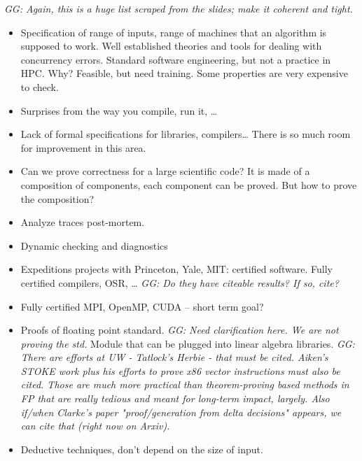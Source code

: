  
 
 \begin{tiny}
 {\small\em GG: Again, this is a huge list scraped
 from the slides; make it coherent and tight.}
 
\begin{itemize}
\item Specification of range of inputs, range of machines that an algorithm is supposed to work. Well established theories and tools for dealing with concurrency errors. Standard software engineering, but not a practice in HPC. Why? Feasible, but need training. Some properties are very expensive to check. 

\item Surprises from the way you compile, run it, …

\item Lack of formal specifications for libraries, compilers… There is so much room for improvement in this area.

\item Can we prove correctness for a large scientific code? It is made of a composition of components, each component can be proved. But how to prove the composition?

\item  Analyze traces post-mortem. 

\item  Dynamic  checking and diagnostics

\item  Expeditions projects with Princeton, Yale, MIT: certified software. Fully certified compilers, OSR, …
 {\small\em GG: Do they have citeable results? If so, cite?}
 
\item  Fully certified MPI, OpenMP, CUDA – short term goal?

\item  Proofs of floating point standard. {\small\em GG: Need clarification here. We are not proving the std.}  Module that can be plugged into linear algebra libraries.
 {\small\em GG: There are efforts at UW - Tatlock's Herbie - that must be cited. Aiken's STOKE work plus his 
 efforts to prove x86 vector instructions must also
 be cited. Those are much more practical than theorem-proving based methods in FP that are really tedious and meant for long-term impact, largely. Also if/when Clarke's paper "proof/generation from delta decisions" appears, 
 we can cite that (right now on Arxiv).}

\item  Deductive techniques, don’t depend on the size of input.


\end{itemize}
\end{tiny}
